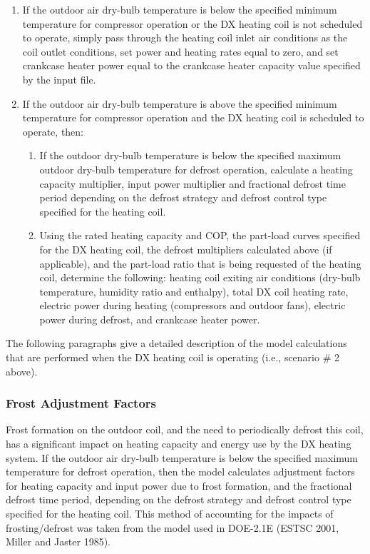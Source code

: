 \begin{enumerate}
\item If the outdoor air dry-bulb temperature is below the specified minimum temperature for compressor operation or the DX heating coil is not scheduled to operate, simply pass through the heating coil inlet air conditions as the coil outlet conditions, set power and heating rates equal to zero, and set crankcase heater power equal to the crankcase heater capacity value specified by the input file.
\item If the outdoor air dry-bulb temperature is above the specified minimum temperature for compressor operation and the DX heating coil is scheduled to operate, then:
\begin{enumerate}
\item If the outdoor dry-bulb temperature is below the specified maximum outdoor dry-bulb temperature for defrost operation, calculate a heating capacity multiplier, input power multiplier and fractional defrost time period depending on the defrost strategy and defrost control type specified for the heating coil.
\item Using the rated heating capacity and COP, the part-load curves specified for the DX heating coil, the defrost multipliers calculated above (if applicable), and the part-load ratio that is being requested of the heating coil, determine the following: heating coil exiting air conditions (dry-bulb temperature, humidity ratio and enthalpy), total DX coil heating rate, electric power during heating (compressors and outdoor fans), electric power during defrost, and crankcase heater power.
\end{enumerate}
\end{enumerate}

The following paragraphs give a detailed description of the model calculations that are performed when the DX heating coil is operating (i.e., scenario \# 2 above).

\subsubsection{Frost Adjustment Factors}\label{frost-adjustment-factors}

Frost formation on the outdoor coil, and the need to periodically defrost this coil, has a significant impact on heating capacity and energy use by the DX heating system. If the outdoor air dry-bulb temperature is below the specified maximum temperature for defrost operation, then the model calculates adjustment factors for heating capacity and input power due to frost formation, and the fractional defrost time period, depending on the defrost strategy and defrost control type specified for the heating coil. This method of accounting for the impacts of frosting/defrost was taken from the model used in DOE-2.1E (ESTSC 2001, Miller and Jaster 1985).

